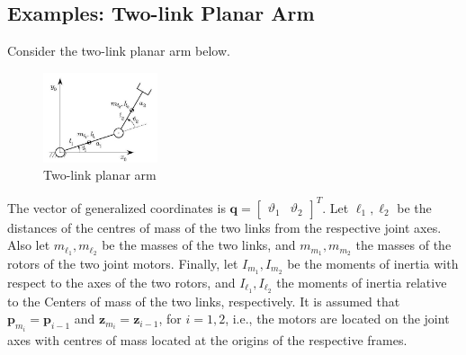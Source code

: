 \documentclass[10pt]{article}
\begin{document}

\subsection{Examples: Two-link Planar Arm}



Consider the two-link planar arm below.

\begin{figure}[H]
    \centering
    \includegraphics[max width=0.3\textwidth]{dynamics/2link_arm.jpg}
    \caption{Two-link planar arm}
    \label{fig:enter-label}
\end{figure}


The vector of generalized coordinates is $\boldsymbol{q}=\left[\begin{array}{ll}\vartheta_{1} & \vartheta_{2}\end{array}\right]^{T}$. Let $\ell_{1}, \ell_{2}$ be the distances of the centres of mass of the two links from the respective joint axes. Also let $m_{\ell_{1}}, m_{\ell_{2}}$ be the masses of the two links, and $m_{m_{1}}, m_{m_{2}}$ the masses of the rotors of the two joint motors. Finally, let $I_{m_{1}}, I_{m_{2}}$ be the moments of inertia with respect to the axes of the two rotors, and $I_{\ell_{1}}, I_{\ell_{2}}$ the moments of inertia relative to the
Centers of mass of the two links, respectively. It is assumed that $\boldsymbol{p}_{m_{i}}=\boldsymbol{p}_{i-1}$ and $\boldsymbol{z}_{m_{i}}=\boldsymbol{z}_{i-1}$, for $i=1,2$, i.e., the motors are located on the joint axes with centres of mass located at the origins of the respective frames.
\end{document}
